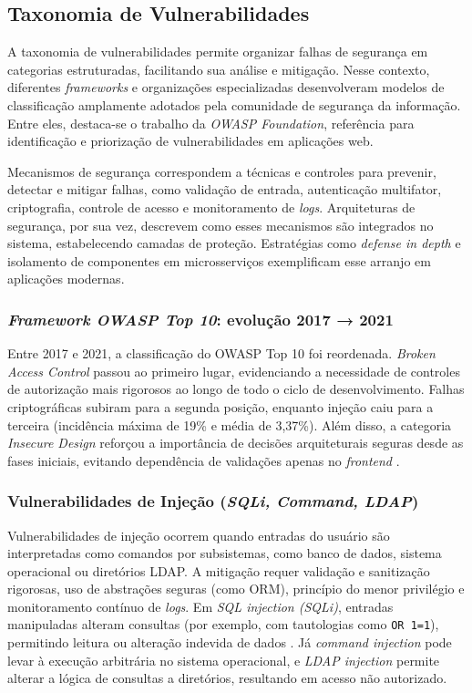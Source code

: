 \subsection{
    Taxonomia de Vulnerabilidades
} \label{sec:taxonomia_vulnerabilidades}


A taxonomia de vulnerabilidades permite organizar falhas de segurança em categorias estruturadas, facilitando sua análise e mitigação. Nesse contexto, diferentes \textit{frameworks} e organizações especializadas desenvolveram modelos de classificação amplamente adotados pela comunidade de segurança da informação. Entre eles, destaca-se o trabalho da \textit{OWASP Foundation}, referência para identificação e priorização de vulnerabilidades em aplicações web. 

Mecanismos de segurança correspondem a técnicas e controles para prevenir, detectar e mitigar falhas, como validação de entrada, autenticação multifator, criptografia, controle de acesso e monitoramento de \textit{logs}. Arquiteturas de segurança, por sua vez, descrevem como esses mecanismos são integrados no sistema, estabelecendo camadas de proteção. Estratégias como \textit{defense in depth} e isolamento de componentes em microsserviços exemplificam esse arranjo em aplicações modernas.

\subsubsection{
    \textit{Framework OWASP Top 10}: evolução 2017 → 2021
}

Entre 2017 e 2021, a classificação do OWASP Top 10 foi reordenada. \textit{Broken Access Control} passou ao primeiro lugar, evidenciando a necessidade de controles de autorização mais rigorosos ao longo de todo o ciclo de desenvolvimento. Falhas criptográficas subiram para a segunda posição, enquanto injeção caiu para a terceira (incidência máxima de 19\% e média de 3,37\%). Além disso, a categoria \textit{Insecure Design} reforçou a importância de decisões arquiteturais seguras desde as fases iniciais, evitando dependência de validações apenas no \textit{frontend} \cite{OWASP2021Top10}.

\subsubsection{
    Vulnerabilidades de Injeção (\textit{SQLi, Command, LDAP})
}

Vulnerabilidades de injeção ocorrem quando entradas do usuário são interpretadas como comandos por subsistemas, como banco de dados, sistema operacional ou diretórios LDAP. A mitigação requer validação e sanitização rigorosas, uso de abstrações seguras (como ORM), princípio do menor privilégio e monitoramento contínuo de \textit{logs}. Em \textit{SQL injection (SQLi)}, entradas manipuladas alteram consultas (por exemplo, com tautologias como \verb|OR 1=1|), permitindo leitura ou alteração indevida de dados \cite{Appelt2014SQLInjectionTesting}. Já \textit{command injection} pode levar à execução arbitrária no sistema operacional, e \textit{LDAP injection} permite alterar a lógica de consultas a diretórios, resultando em acesso não autorizado.

